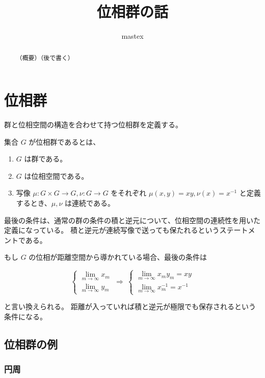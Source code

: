 \documentclass[uplatex,a4j,12pt,dvipdfmx]{jsarticle}
\title{
位相群の話
}
\author{
mastex
}
\begin{document}
\maketitle


\begin{abstract}
	（概要）（後で書く）
\end{abstract}

\section{位相群}

群と位相空間の構造を合わせて持つ位相群を定義する。

集合 $G$ が位相群であるとは、

\begin{enumerate}
	\item $G$ は群である。
	\item $G$ は位相空間である。
	\item 写像 $\mu: G \times G \to G, \nu: G \to G$ をそれぞれ $\mu(x,y)=xy, \nu(x) = x^{-1}$ と定義するとき、$\mu,\nu$ は連続である。
\end{enumerate}

最後の条件は、通常の群の条件の積と逆元について、位相空間の連続性を用いた定義になっている。
積と逆元が連続写像で送っても保たれるというステートメントである。


もし $G$ の位相が距離空間から導かれている場合、最後の条件は

\[
	\left\{
	\begin{array}{r}
		\displaystyle \lim_{ m \to \infty } x_{m} \\
		\displaystyle \lim_{ m \to \infty } y_{m}
	\end{array}
	\right.
	\ \Rightarrow \
	\left\{
	\begin{array}{r}
		\displaystyle \lim_{m \to \infty } x_{m} y_{m} = xy \\
		\displaystyle \lim_{m \to \infty } x_{m}^{-1} = x^{-1}
	\end{array}
	\right.
\]

と言い換えられる。
距離が入っていれば積と逆元が極限でも保存されるという条件になる。





\subsection{位相群の例}

\subsubsection{円周}
\end{document}
